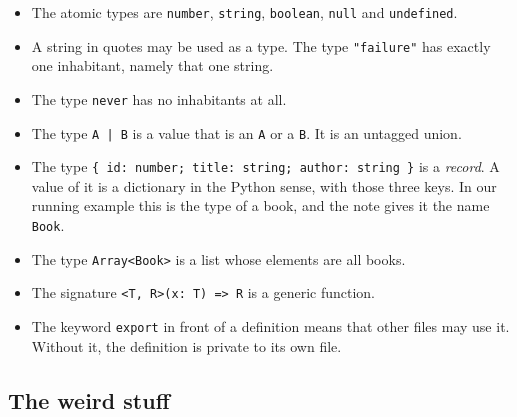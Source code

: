 \documentclass[11pt,a4paper]{article}
\begin{document}
\begin{listbox}
\begin{itemize}\setlength{\itemsep}{2pt}

\item The atomic types are \texttt{number}, \texttt{string}, \texttt{boolean}, \texttt{null} and
      \texttt{undefined}.

\item A string in quotes may be used as a type. The type \texttt{"failure"} has exactly one
      inhabitant, namely that one string.

\item The type \texttt{never} has no inhabitants at all.

\item The type \texttt{A | B} is a value that is an \texttt{A} or a \texttt{B}. It is an
      untagged union.

\item The type \texttt{\{ id: number; title: string; author: string \}} is a \emph{record}. A
      value of it is a dictionary in the Python sense, with those three keys. In our running
      example this is the type of a book, and the note gives it the name \texttt{Book}.

\item The type \texttt{Array<Book>} is a list whose elements are all books.

\item The signature \texttt{<T, R>(x: T) => R} is a generic function.

\item The keyword \texttt{export} in front of a definition means that other files may use it.
      Without it, the definition is private to its own file.

\end{itemize}
\end{listbox}

\subsection{The weird stuff}
\end{document}
